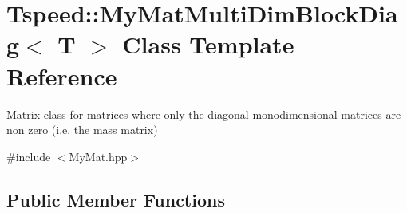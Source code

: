 \hypertarget{classTspeed_1_1MyMatMultiDimBlockDiag}{\section{Tspeed\-:\-:My\-Mat\-Multi\-Dim\-Block\-Diag$<$ T $>$ Class Template Reference}
\label{classTspeed_1_1MyMatMultiDimBlockDiag}
}


Matrix class for matrices where only the diagonal monodimensional matrices are non zero (i.\-e. the mass matrix)  




{\ttfamily \#include $<$My\-Mat.\-hpp$>$}

\subsection*{Public Member Functions}
